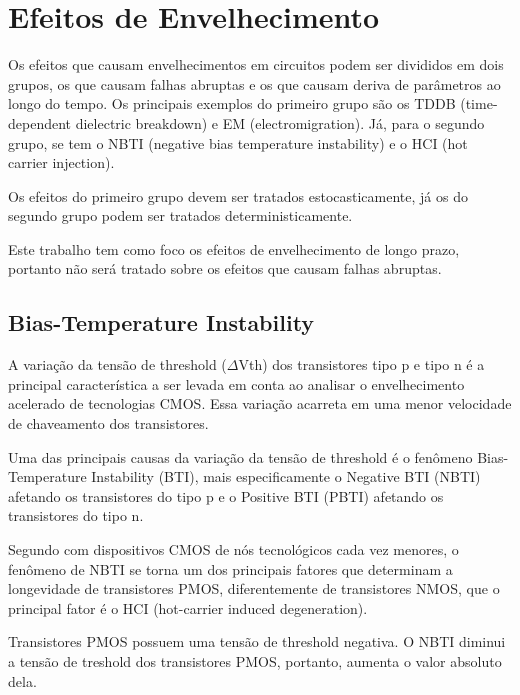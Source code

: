 \section{Efeitos de Envelhecimento}
Os efeitos que causam envelhecimentos em circuitos podem ser divididos em dois grupos, os que causam falhas abruptas e os que causam deriva de parâmetros ao longo do tempo. Os principais exemplos do primeiro grupo são os TDDB (time-dependent dielectric breakdown) e EM (electromigration). Já, para o segundo grupo, se tem o NBTI (negative bias temperature instability) e o HCI (hot carrier injection).

Os efeitos do primeiro grupo devem ser tratados estocasticamente, já os do segundo grupo podem ser tratados deterministicamente.

Este trabalho tem como foco os efeitos de envelhecimento de longo prazo, portanto não será tratado sobre os efeitos que causam falhas abruptas.

\subsection{Bias-Temperature Instability}
A variação da tensão de threshold ($\Delta$Vth) dos transistores tipo p e tipo n é a principal característica a ser levada em conta ao analisar o envelhecimento acelerado de tecnologias CMOS. Essa variação acarreta em uma menor velocidade de chaveamento dos transistores.

Uma das principais causas da variação da tensão de threshold é o fenômeno Bias-Temperature Instability (BTI), mais especificamente o Negative BTI (NBTI) afetando os transistores do tipo p e o Positive BTI (PBTI) afetando os transistores do tipo n.

Segundo \cite{Bhardwaj} com dispositivos CMOS de nós tecnológicos cada vez menores, o fenômeno de NBTI se torna um dos principais fatores que determinam a longevidade de transistores PMOS, diferentemente de transistores NMOS, que o principal fator é o HCI (hot-carrier induced degeneration).

Transistores PMOS possuem uma tensão de threshold negativa. O NBTI diminui a tensão de treshold dos transistores PMOS, portanto, aumenta o valor absoluto dela.



